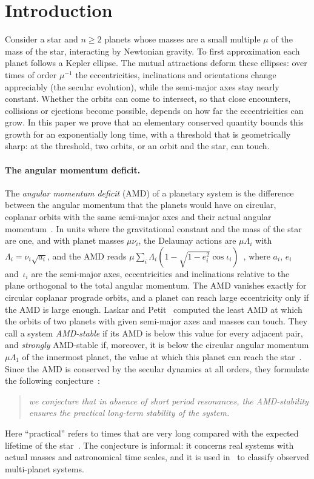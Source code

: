 \section{Introduction}\label{sec:intro}

Consider a star and $n\geq2$ planets whose masses are a small multiple $\mu$ of the mass of the star, interacting by Newtonian gravity. To first approximation each planet follows a Kepler ellipse. The mutual attractions deform these ellipses: over times of order $\mu^{-1}$ the eccentricities, inclinations and orientations change appreciably (the secular evolution), while the semi-major axes stay nearly constant. Whether the orbits can come to intersect, so that close encounters, collisions or ejections become possible, depends on how far the eccentricities can grow. In this paper we prove that an elementary conserved quantity bounds this growth for an exponentially long time, with a threshold that is geometrically sharp: at the threshold, two orbits, or an orbit and the star, can touch.

\paragraph{The angular momentum deficit.} The \emph{angular momentum deficit} (AMD) of a planetary system is the difference between the angular momentum that the planets would have on circular, coplanar orbits with the same semi-major axes and their actual angular momentum~\cite[\S2.2]{LP17}. In units where the gravitational constant and the mass of the star are one, and with planet masses $\mu\nu_i$, the Delaunay actions are $\mu\Lambda_i$ with $\Lambda_i=\nu_i\sqrt{a_i}$, and the AMD reads $\mu\sum_i\Lambda_i(1-\sqrt{1-e_i^2}\cos\iota_i)$~\cite[(11)]{LP17}, where $a_i$, $e_i$ and~$\iota_i$ are the semi-major axes, eccentricities and inclinations relative to the plane orthogonal to the total angular momentum. The AMD vanishes exactly for circular coplanar prograde orbits, and a planet can reach large eccentricity only if the AMD is large enough. Laskar and Petit~\cite[\S3]{LP17} computed the least AMD at which the orbits of two planets with given semi-major axes and masses can touch. They call a system \emph{AMD-stable} if its AMD is below this value for every adjacent pair, and \emph{strongly} AMD-stable if, moreover, it is below the circular angular momentum $\mu\Lambda_1$ of the innermost planet, the value at which this planet can reach the star~\cite[\S5 and \S5.3]{LP17}. Since the AMD is conserved by the secular dynamics at all orders, they formulate the following conjecture~\cite[\S3]{LP17}:
\begin{quote}
\emph{we conjecture that in absence of short period resonances, the AMD-stability ensures the practical long-term stability of the system.}
\end{quote}
Here ``practical'' refers to times that are very long compared with the expected lifetime of the star~\cite[\S3, footnote~1]{LP17}. The conjecture is informal: it concerns real systems with actual masses and astronomical time scales, and it is used in~\cite{LP17} to classify observed multi-planet systems.

